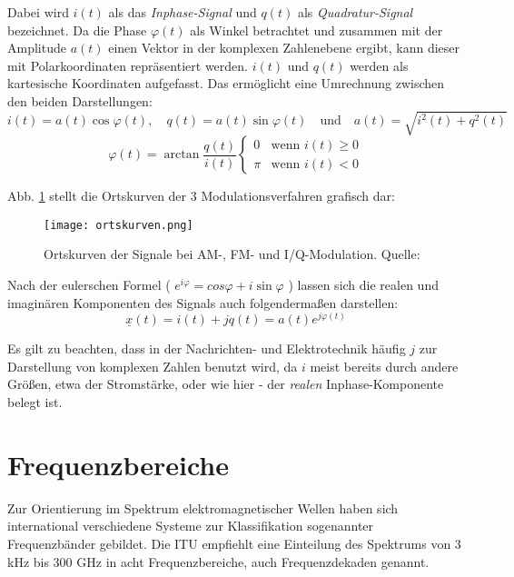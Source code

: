 Dabei wird \(i(t) \)  als das \textit{Inphase-Signal} und \(q(t)\) als \textit{Quadratur-Signal} bezeichnet.
Da die Phase $\varphi(t)$ als Winkel betrachtet und zusammen mit der Amplitude $a(t)$ einen Vektor in der komplexen Zahlenebene ergibt, kann dieser mit Polarkoordinaten repräsentiert werden.
$i(t)$ und $q(t)$ werden als kartesische Koordinaten aufgefasst.
Das ermöglicht eine Umrechnung zwischen den beiden Darstellungen:
\[ i(t) = a(t) \cos \varphi(t),  \quad q(t) = a(t)\sin \varphi(t) \quad \text{und} \quad  a(t) = \sqrt{i^2 (t) + q^2(t)}\]
\[  \varphi (t) = \arctan \frac{q(t)}{i(t)}  
					\begin{cases} 
						0	 & \text{wenn } i(t) \geq 0 \\
						\pi  & \text{wenn } i(t) < 0
					\end{cases}
\]

Abb. \ref{ortskurven} stellt die Ortskurven der 3 Modulationsverfahren grafisch dar:
\begin{figure}[ht]
	\centering
	\texttt{[image: ortskurven.png]}
	\caption[Ortskurven der Signale bei AM-, FM- und I/Q-Modulation]{Ortskurven der Signale bei AM-, FM- und I/Q-Modulation. Quelle: \cite[Heuberger, e. a., S. 141]{Heuberger:2017}} 
	\label{ortskurven}
\end{figure}


\newpage

Nach der eulerschen Formel ( \( e^{i\varphi} = cos \varphi + i \sin \varphi \) ) lassen sich die realen und imaginären Komponenten des Signals auch folgendermaßen darstellen:
\[ \underline{x} (t) = i(t) + jq(t) = a(t) e^{j \varphi(t)}\]

Es gilt zu beachten, dass in der Nachrichten- und Elektrotechnik häufig $j$ zur Darstellung von komplexen Zahlen benutzt wird, da $i$ meist bereits durch andere Größen, etwa der Stromstärke, oder wie hier - der \textit{realen} Inphase-Komponente belegt ist.


\newpage
\section{Frequenzbereiche}
\label{section-frequenzbereiche}
Zur Orientierung im Spektrum elektromagnetischer Wellen haben sich international verschiedene Systeme zur Klassifikation sogenannter Frequenzbänder gebildet. Die \ac{ITU} empfiehlt eine Einteilung des Spektrums von 3 kHz bis 300 GHz in acht Frequenzbereiche, auch Frequenzdekaden genannt. \cite[vgl. ITU-R v.431-8]{itu-431:2015}

